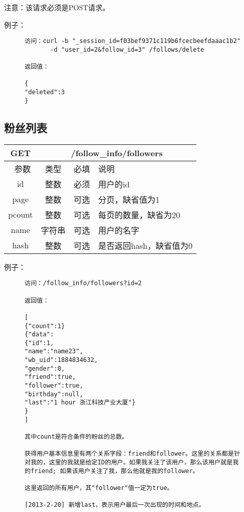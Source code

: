 注意：该请求必须是POST请求。

例子：

\begin{figure}[H]
\begin{verbatim}
访问：curl -b "_session_id=f03bef9371c119b6fcecbeefdaaac1b2"
       -d "user_id=2&follow_id=3" /follows/delete

返回值：

{
"deleted":3
}

\end{verbatim}
\end{figure}



\subsection{粉丝列表}

\begin{table}[H]
   \begin{center}
\begin{tabular}{|c|c|c|p{12cm}|}
\hline
GET & \multicolumn{3}{|c|}{/follow\_info/followers} \\
\hline\hline
 \  参数  & 类型 & 必填 &  说明  \\
\hline
 id  & 整数 & 必须 & 用户的id\\
   \hline
 page  & 整数 & 可选 & 分页，缺省值为1\\ 
 \hline
 pcount  & 整数 & 可选 & 每页的数量，缺省为20\\ 
    \hline
 name  & 字符串 & 可选 & 用户的名字\\ 
    \hline    
 hash  & 整数 & 可选 & 是否返回hash，缺省值为0\\ 
\hline

\end{tabular}
   \end{center}
\end{table}

例子：

\begin{figure}[H]
\begin{verbatim}
访问：/follow_info/followers?id=2

返回值：

[
{"count":1}
{"data":
{"id":1,
"name":"name23",
"wb_uid":1884834632,
"gender":0,
"friend":true,
"follower":true,
"birthday":null,
"last":"1 hour 浙江科技产业大厦"}
}
]

其中count是符合条件的粉丝的总数。

获得用户基本信息里有两个关系字段：friend和follower。这里的关系都是针对我的，这里的我就是给定ID的用户。如果我关注了该用户，那么该用户就是我的friend; 如果该用户关注了我，那么他就是我的follower。

这里返回的所有用户，其"follower"值一定为true。

[2013-2-20] 新增last，表示用户最后一次出现的时间和地点。


\end{verbatim}
\end{figure}


